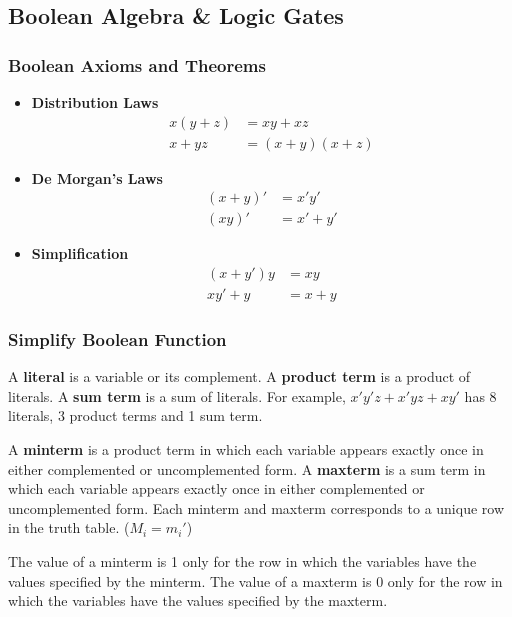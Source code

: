 \documentclass[a4paper,12pt]{article}
\begin{document}
\subsection{Boolean Algebra \& Logic Gates}

\subsubsection{Boolean Axioms and Theorems}

\begin{center}
	\begin{itemize}
		\item \textbf{Distribution Laws}
			\begin{align*}
				x(y+z) &= xy + xz \\
				x + yz &= (x+y)(x+z)
			\end{align*}
		\item \textbf{De Morgan's Laws}
			\begin{align*}
				(x+y)' &= x'y' \\
				(xy)' &= x' + y'
			\end{align*}
		\item \textbf{Simplification}
			\begin{align*}
				(x+y')y &= xy \\
				xy' + y &= x + y 
			\end{align*}
	\end{itemize}
\end{center}

\subsubsection{Simplify Boolean Function}

A \textbf{literal} is a variable or its complement.
A \textbf{product term} is a product of literals.
A \textbf{sum term} is a sum of literals.
For example, $x'y'z + x'yz + xy'$ has 8 literals, 3 product terms and 1 sum term.

A \textbf{minterm} is a product term in which each variable appears exactly once in either complemented or uncomplemented form.
A \textbf{maxterm} is a sum term in which each variable appears exactly once in either complemented or uncomplemented form.
Each minterm and maxterm corresponds to a unique row in the truth table. ($M_i = m_i'$)

The value of a minterm is 1 only for the row in which the variables have the values specified by the minterm.
The value of a maxterm is 0 only for the row in which the variables have the values specified by the maxterm.
\end{document}
